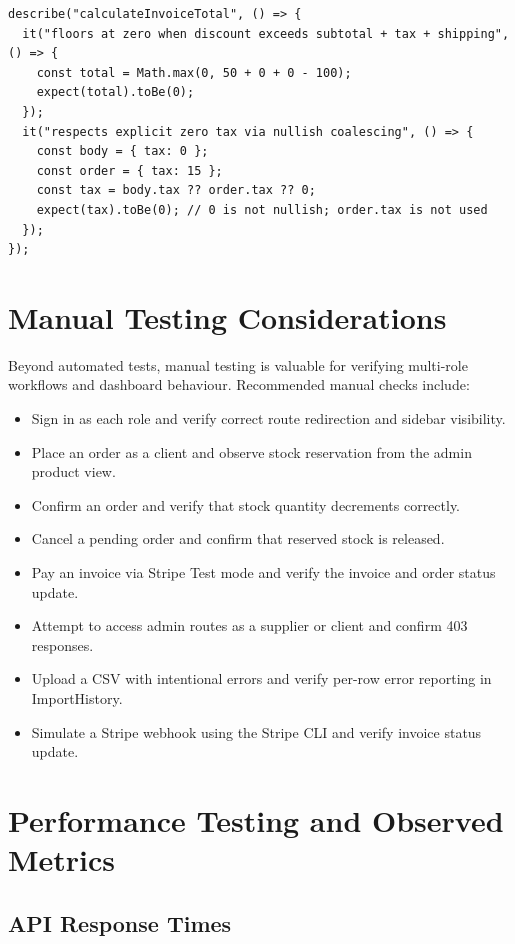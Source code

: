 \documentclass[12pt,a4paper]{report}
\begin{document}
\begin{lstlisting}[caption={Unit test --- invoice total with discount exceeding subtotal}]
describe("calculateInvoiceTotal", () => {
  it("floors at zero when discount exceeds subtotal + tax + shipping", () => {
    const total = Math.max(0, 50 + 0 + 0 - 100);
    expect(total).toBe(0);
  });
  it("respects explicit zero tax via nullish coalescing", () => {
    const body = { tax: 0 };
    const order = { tax: 15 };
    const tax = body.tax ?? order.tax ?? 0;
    expect(tax).toBe(0); // 0 is not nullish; order.tax is not used
  });
});
\end{lstlisting}

\section{Manual Testing Considerations}

Beyond automated tests, manual testing is valuable for verifying multi-role workflows and dashboard behaviour. Recommended manual checks include:
\begin{itemize}
    \item Sign in as each role and verify correct route redirection and sidebar visibility.
    \item Place an order as a client and observe stock reservation from the admin product view.
    \item Confirm an order and verify that stock quantity decrements correctly.
    \item Cancel a pending order and confirm that reserved stock is released.
    \item Pay an invoice via Stripe Test mode and verify the invoice and order status update.
    \item Attempt to access admin routes as a supplier or client and confirm 403 responses.
    \item Upload a CSV with intentional errors and verify per-row error reporting in ImportHistory.
    \item Simulate a Stripe webhook using the Stripe CLI and verify invoice status update.
\end{itemize}

\section{Performance Testing and Observed Metrics}

\subsection{API Response Times}
\end{document}
